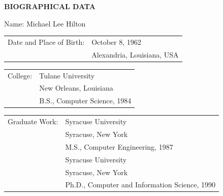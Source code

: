 \clearpage
\thispagestyle{plain}
\begin{center}
\textbf{BIOGRAPHICAL DATA}
\end{center}

\vspace{1.5in}

\noindent Name: Michael Lee Hilton

\vspace{1.5em}

\noindent\begin{tabular}{@{}l@{\ }l@{}}
Date and Place of Birth: & October 8, 1962\\
& Alexandria, Louisiana, USA
\end{tabular}

\vspace{1.5em}

\noindent\begin{tabular}{@{}l@{\ }l@{}}
College: & Tulane University\\
& New Orleans, Louisiana\\
& B.S., Computer Science, 1984
\end{tabular}

\vspace{1.5em}

\noindent\begin{tabular}{@{}l@{\ }l@{}}
Graduate Work: & Syracuse University\\
& Syracuse, New York\\
& M.S., Computer Engineering, 1987\\[1.5em]
& Syracuse University\\
& Syracuse, New York\\
& Ph.D., Computer and Information Science, 1990
\end{tabular}
